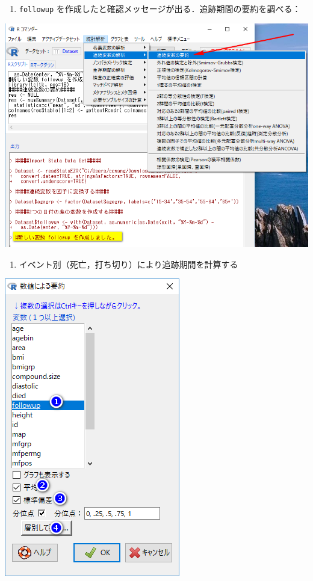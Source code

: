 \documentclass[11pt,]{problemset}
\providecommand{\tightlist}{%
  \setlength{\itemsep}{0pt}\setlength{\parskip}{0pt}}
\begin{document}
\begin{enumerate}
\def\labelenumi{\arabic{enumi}.}
\setcounter{enumi}{2}
\tightlist
\item
  \texttt{followup}
  を作成したと確認メッセージが出る．追跡期間の要約を調べる：
\end{enumerate}

\begin{center}\includegraphics[width=0.7\linewidth,height=0.35\textheight]{pic/survival02} \end{center}

\begin{enumerate}
\def\labelenumi{\arabic{enumi}.}
\setcounter{enumi}{3}
\tightlist
\item
  イベント別（死亡，打ち切り）により追跡期間を計算する
\end{enumerate}

\begin{center}\includegraphics[width=0.55\linewidth,height=0.35\textheight]{pic/survival03} \end{center}
\end{document}
